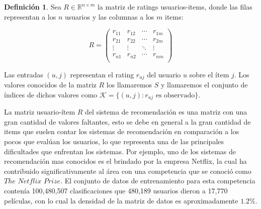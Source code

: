 \documentclass[hidelinks,12pt,a4paper]{book}
\theoremstyle{plain}
\theoremstyle{definition}
\newtheorem{definicion}[theorem]{Definición} %
\begin{document}
\begin{definicion}
Sea $R \in \mathbb{R}^{n\times m}$ la matriz de ratings usuarios-items, donde las filas representan a los $n$ usuarios y las columnas a los $m$ items:

\[
R =
\begin{pmatrix}
r_{1 1} & r_{1 2} & \cdots & r_{1 m}\\
r_{2 1} & r_{2 2} & \cdots & r_{2 m}\\
\vdots & \vdots & \ddots & \vdots \\
r_{n 1} & r_{n 2} & \cdots & r_{n m}\\
\end{pmatrix}
\]

Las entradas $(u,j)$ representan el rating $r_{uj}$ del usuario $u$ sobre el ítem $j$. Los valores conocidos de la matriz $R$ los llamaremos $S$ y llamaremos el conjunto de índices de dichos valores como $\mathcal{K}=\{(u,j):r_{uj} \text{ es observado}\}$.
\end{definicion}

La matriz usuario-ítem $R$ del sistema de recomendación es una matriz con una gran cantidad de valores faltantes, esto se debe en general a la gran cantidad de items que suelen contar los sistemas de recomendación en comparación a los pocos que evalúan los usuarios, lo que representa una de las principales dificultades que enfrentan los sistemas. Por ejemplo, uno de los sistemas de recomendación mas conocidos es el brindado por la empresa Netflix, la cual ha contribuido significativamente al área con una competencia que se conoció como $The$ $Netflix$ $Prize$\cite{bennett2007netflix}. El conjunto de datos de entrenamiento para esta competencia contenía 100,480,507 clasificaciones que 480,189 usuarios dieron a 17,770 películas, con lo cual la densidad de la matriz de datos es aproximadamente $1.2\%$.
\end{document}
